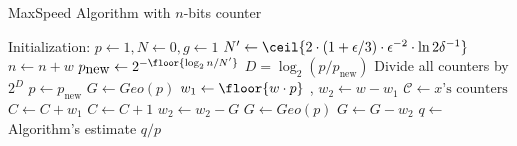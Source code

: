\begin{algorithm}[ht]
\small
\caption {{\sc MaxSpeed} Algorithm with $n$-bits counter\label{alg:maxSpeed}}
\begin{algorithmic}[1]
\Statex Initialization: $p\gets 1, N\gets 0, g\gets 1$
\Statex \qquad{}\qquad{}\qquad{} $N'\gets\ceil{2\cdot(1+\epsilon/3)\cdot\epsilon^{-2}\cdot{\ln2\delta^{-1}}}$
    \State $n\gets n + w$
    \State $p_{\mbox{new}}\gets 2^{-\floor{\log_2 n/N'}}$
        \State $D=\log_2 (p/p_{\mbox{new}})$
        \State Divide all counters by $2^D$
        \State $p\gets p_{\mbox{new}}$
        \State $G\gets \mathit{Geo}(p)$ 
    \EndIf
    \State $w_1\gets \floor{w\cdot p}$
    ,\quad{}
    $w_2\gets w-w_1$
    \State \label{linegenspeed}$\mathcal C\gets \mbox{$x$'s counters}$ 
        \State $C\gets C + w_1$
            \State $C\gets C+1$
            \State $w_2\gets w_2 - G$
            \State $G\gets \mathit{Geo}(p)$ 
        \EndWhile
        \State $G\gets G - w_2$
    \EndFor
\EndProcedure
{}
    \State $q \gets$ Algorithm's estimate
    \State\Return $q/p$
\EndProcedure
\end{algorithmic}
\end{algorithm}
